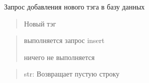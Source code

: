 \documentclass[letterpaper,10pt,russian]{sphinxmanual}
\begin{document}
\begin{fulllineitems}
\label{\detokenize{blueprints:blueprints.add_to_database.add_new_tag}}
\pysigstartsignatures
{}
\pysigstopsignatures
\sphinxAtStartPar
Запрос добавления нового тэга в базу данных
\begin{description}
\begin{quote}\begin{description}
\sphinxAtStartPar
Новый тэг

\end{description}\end{quote}

\begin{quote}\begin{description}
\sphinxAtStartPar
выполняется запрос insert

\sphinxAtStartPar
ничего не выполняется

\end{description}\end{quote}

\end{description}
\begin{quote}\begin{description}
\sphinxAtStartPar
str: Возвращает пустую строку

\end{description}\end{quote}

\end{fulllineitems}

\end{document}
